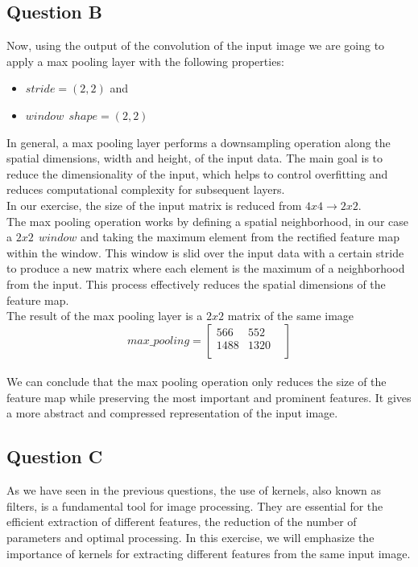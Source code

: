 \subsection{Question B}
Now, using the output of the convolution of the input image we are going to apply a max pooling layer with the following properties: 
\begin{itemize}
	\item $stride = \left(2,2\right)$ and 
	\item $	window\ \ shape = \left(2, 2\right)$
\end{itemize}
In general, a max pooling layer performs a downsampling operation along the spatial dimensions, width and height, of the input data. The main goal is to reduce the dimensionality of the input, which helps to control overfitting and reduces computational complexity for subsequent layers.\\
In our exercise, the size of the input matrix is reduced from $ 4 x 4 \rightarrow 2 x 2$.\\
 
The max pooling operation works by defining a spatial neighborhood, in our case a $ 2 x 2\ \ window$ and taking the maximum element from the rectified feature map within the window. This window is slid over the input data with a certain stride to produce a new matrix where each element is the maximum of a neighborhood from the input. This process effectively reduces the spatial dimensions of the feature map.\\

The result of the max pooling layer is a $2 x 2$ matrix of the same image
\begin{equation}
	max\_pooling = \begin{bmatrix}
		566 & 552   \\
		1488 & 1320 &  \\
	\end{bmatrix}
\end{equation}
\\
We can conclude that the max pooling operation only reduces the size of the feature map while preserving the most important and prominent features. It gives a more abstract and compressed representation of the input image.
\vspace{3mm}

\subsection{Question C}
As we have seen in the previous questions, the use of kernels, also known as filters, is a fundamental tool for image processing. They are essential for the efficient extraction of different features, the reduction of the number of parameters and optimal processing. In this exercise, we will emphasize the importance of kernels for extracting different features from the same input image.\\

